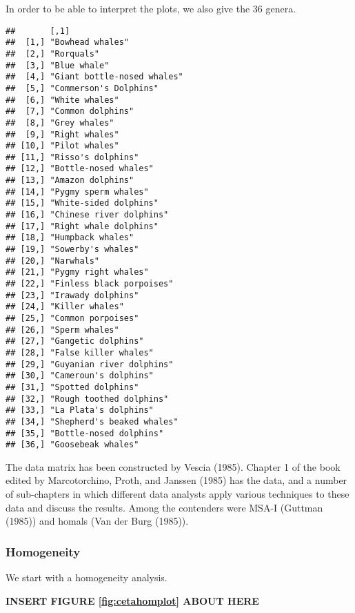 \documentclass[
  12pt,
]{article}
\begin{document}
In order to be able to interpret the plots, we also give the 36 genera.

\begin{verbatim}
##       [,1]                       
##  [1,] "Bowhead whales"           
##  [2,] "Rorquals"                 
##  [3,] "Blue whale"               
##  [4,] "Giant bottle-nosed whales"
##  [5,] "Commerson's Dolphins"     
##  [6,] "White whales"             
##  [7,] "Common dolphins"          
##  [8,] "Grey whales"              
##  [9,] "Right whales"             
## [10,] "Pilot whales"             
## [11,] "Risso's dolphins"         
## [12,] "Bottle-nosed whales"      
## [13,] "Amazon dolphins"          
## [14,] "Pygmy sperm whales"       
## [15,] "White-sided dolphins"     
## [16,] "Chinese river dolphins"   
## [17,] "Right whale dolphins"     
## [18,] "Humpback whales"          
## [19,] "Sowerby's whales"         
## [20,] "Narwhals"                 
## [21,] "Pygmy right whales"       
## [22,] "Finless black porpoises"  
## [23,] "Irawady dolphins"         
## [24,] "Killer whales"            
## [25,] "Common porpoises"         
## [26,] "Sperm whales"             
## [27,] "Gangetic dolphins"        
## [28,] "False killer whales"      
## [29,] "Guyanian river dolphins"  
## [30,] "Cameroun's dolphins"      
## [31,] "Spotted dolphins"         
## [32,] "Rough toothed dolphins"   
## [33,] "La Plata's dolphins"      
## [34,] "Shepherd's beaked whales" 
## [35,] "Bottle-nosed dolphins"    
## [36,] "Goosebeak whales"
\end{verbatim}

The data matrix has been constructed by Vescia (1985). Chapter 1 of the
book edited by Marcotorchino, Proth, and Janssen (1985) has the data, and a number of sub-chapters in which different data analysts
apply various techniques to these data and discuss the results. Among the contenders were MSA-I (Guttman (1985)) and homals (Van der Burg (1985)).

\subsubsection{Homogeneity}\label{homogeneity-1}

We start with a homogeneity analysis.

\begin{greybox}

\begin{center}
\textbf{INSERT FIGURE \ref{fig:cetahomplot} ABOUT HERE}

\end{center}

\end{greybox}
\end{document}

